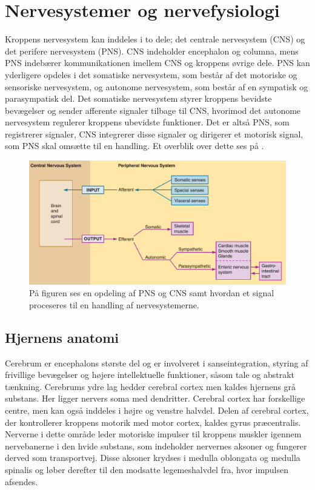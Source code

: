 \chapter{Nervesystemer og nervefysiologi}\label{AppNerve}
Kroppens nervesystem kan inddeles i to dele; det centrale nervesystem (CNS) og det perifere nervesystem (PNS). CNS indeholder encephalon og columna, mens PNS indebærer kommunikationen imellem CNS og kroppens øvrige dele. PNS kan yderligere opdeles i det somatiske nervesystem, som består af det motoriske og sensoriske nervesystem, og autonome nervesystem, som består af en sympatisk og parasympatisk del. Det somatiske nervesystem styrer kroppens bevidste bevægelser og sender afferente signaler tilbage til CNS, hvorimod det autonome nervesystem regulerer kroppens ubevidste funktioner. Det er altså PNS, som registrerer signaler, CNS integrerer disse signaler og dirigerer et motorisk signal, som PNS skal omsætte til en handling. \cite{Martini2012,Stanfield2014} Et overblik over dette ses på .

\begin{figure}[H]
	\centering
	\includegraphics[scale=0.5]{figures/bProblemanalyse/Nervesys1.png}
	\caption{På figuren ses en opdeling af PNS og CNS samt hvordan et signal proceseres til en handling af nervesystemerne. \cite{Stanfield2014}}
	\label{Nersys}
\end{figure}

\section{Hjernens anatomi}
Cerebrum er encephalons største del og er involveret i sanseintegration, styring af frivillige bevægelser og højere intellektuelle funktioner, såsom tale og abstrakt tænkning. \cite{Academic2015b} Cerebrums ydre lag hedder cerebral cortex men kaldes hjernens grå substans. Her ligger nervers soma med dendritter. Cerebral cortex har forskellige centre, men kan også inddeles i højre og venstre halvdel. Delen af cerebral cortex, der kontrollerer kroppens motorik med motor cortex, kaldes gyrus præcentralis. Nerverne i dette område leder motoriske impulser til kroppens muskler igennem nervebanerne i den hvide substans, som indeholder nervernes aksoner og fungerer derved som transportvej. \cite{Martini2012,Stanfield2014,Academic2015b} Disse aksoner krydses i medulla oblongata og medulla spinalis og løber derefter til den modsatte legemeshalvdel fra, hvor impulsen afsendes. \cite{Martini2012}

